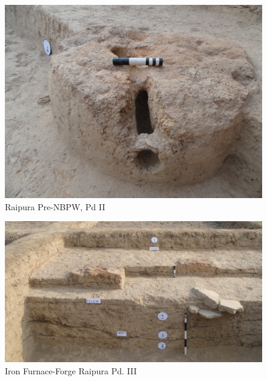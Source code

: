 \begin{figure}[H]
\setcounter{figure}{7}
\includegraphics[scale=0.75]{images/chapter-4/fig008.jpg}
\caption{Raipura Pre-NBPW, Pd II}\label{chapter-4-fig8}
\end{figure}

\begin{figure}[H]
\includegraphics[scale=0.75]{images/chapter-4/fig009.jpg}
\caption{Iron Furnace-Forge Raipura Pd. III}\label{chapter-4-fig9}
\end{figure}

\newpage

